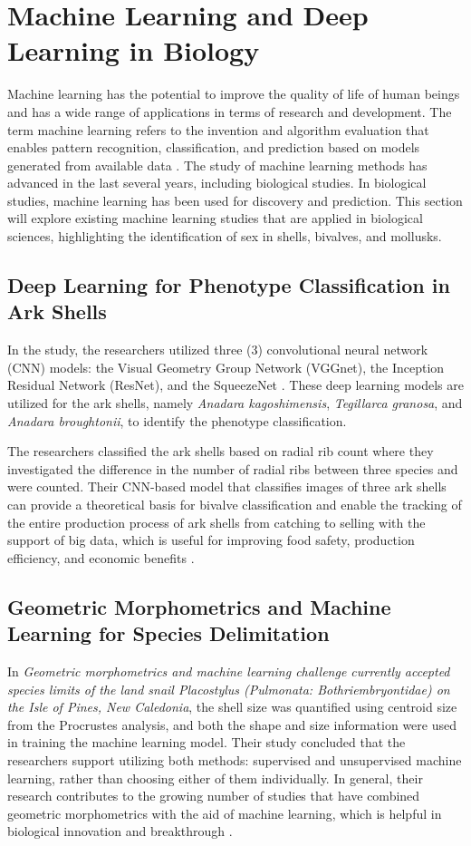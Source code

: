 {\section{Machine Learning and Deep Learning in Biology}
Machine learning has the potential to improve the quality of life of human beings and has a wide range of applications in terms of research and development. The term machine learning refers to the invention and algorithm evaluation that enables pattern recognition, classification, and prediction based on models generated from available data \cite{tarca2007}. The study of machine learning methods has advanced in the last several years, including biological studies. In biological studies, machine learning has been used for discovery and prediction. This section will explore existing machine learning studies that are applied in biological sciences, highlighting the identification of sex in shells, bivalves, and mollusks.
\vspace{-10pt}

\subsection{Deep Learning for Phenotype Classification in Ark Shells}
In the study, the researchers utilized three (3) convolutional neural network (CNN) models: the Visual Geometry Group Network (VGGnet), the Inception Residual Network (ResNet), and the SqueezeNet \cite{kim2024}. These deep learning models are utilized for the ark shells, namely \textit{Anadara kagoshimensis}, \textit{Tegillarca granosa}, and \textit{Anadara broughtonii}, to identify the phenotype classification. 

The researchers classified the ark shells based on radial rib count where they investigated the difference in the number of radial ribs between three species and were counted. Their CNN-based model that classifies images of three ark shells can provide a theoretical basis for bivalve classification and enable the tracking of the entire production process of ark shells from catching to selling with the support of big data, which is useful for improving food safety, production efficiency, and economic benefits \cite{kim2024}.

\subsection{Geometric Morphometrics and Machine Learning for Species Delimitation}
In \textit{Geometric morphometrics and machine learning challenge currently accepted species limits of the land snail Placostylus (Pulmonata: Bothriembryontidae) on the Isle of Pines, New Caledonia}, the shell size was quantified using centroid size from the Procrustes analysis, and both the shape and size information were used in training the machine learning model. Their study concluded that the researchers support utilizing both methods: supervised and unsupervised machine learning, rather than choosing either of them individually. In general, their research contributes to the growing number of studies that have combined geometric morphometrics with the aid of machine learning, which is helpful in biological innovation and breakthrough \cite{quenu2020}.

}
